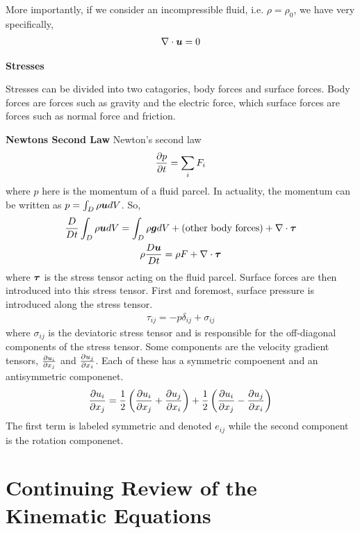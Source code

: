 \documentclass{article}
\begin{document}
More importantly, if we consider an incompressible fluid, i.e. $\rho = \rho_0$,
we have very specifically,
\begin{gather}
    \nabla \cdot \boldsymbol{u} = 0
\end{gather}


\vspace{20pt}
{\Large \textbf{Stresses}}
\vspace{5pt}

Stresses can be divided into two catagories, body forces and surface forces.
Body forces are forces such as gravity and the electric force, which surface forces are
forces such as normal force and friction. 

\vspace{20pt}
{\Large \textbf{Newtons Second Law}}
\vspace{5pt}
Newton's second law 
\begin{gather*}
    \frac{\partial p}{\partial t} = \sum_i F_i
\end{gather*}
where $p$ here is the momentum of a fluid parcel. In actuality, the momentum can
be written as $p = \int_D \rho\boldsymbol{u} dV$. So, 
\begin{gather*}
    \frac{D }{D t}\int_D \rho\boldsymbol{u} dV = \int_D \rho \boldsymbol{g} dV + (\text{other body
    forces}) + \nabla \cdot \boldsymbol{\tau}\\
    \rho\frac{D \boldsymbol{u}}{D t} = \rho F + \nabla\cdot\boldsymbol{\tau}
\end{gather*}
where $\boldsymbol{\tau}$ is the stress tensor acting on the fluid parcel. Surface
forces are then introduced into this stress tensor. First and foremost, surface
pressure is introduced along the stress tensor. 
\begin{gather*}
    \tau_{ij} = -p\delta_{ij} + \sigma_{ij}
\end{gather*}
where $\sigma_{ij}$ is the deviatoric stress tensor and is responsible for the
off-diagonal components of the stress tensor. Some components are the velocity
gradient tensors, $\frac{\partial u_i}{\partial x_j}$ and $\frac{\partial u_j}{\partial x_i}$. Each of these has a symmetric
compoenent and an antisymmetric componenet. 
\begin{gather*}
    \frac{\partial u_i}{\partial x_j} = \frac{1}{2}\left(\frac{\partial u_i}{\partial x_j} + \frac{\partial u_j}{\partial x_i}\right) +
    \frac{1}{2}\left(\frac{\partial u_i}{\partial x_j} - \frac{\partial u_j}{\partial x_i}\right)
\end{gather*}
The first term is labeled symmetric and denoted $e_{ij}$ while the second
component is the rotation componenet. 



\section{Continuing Review of the Kinematic Equations}
\end{document}
